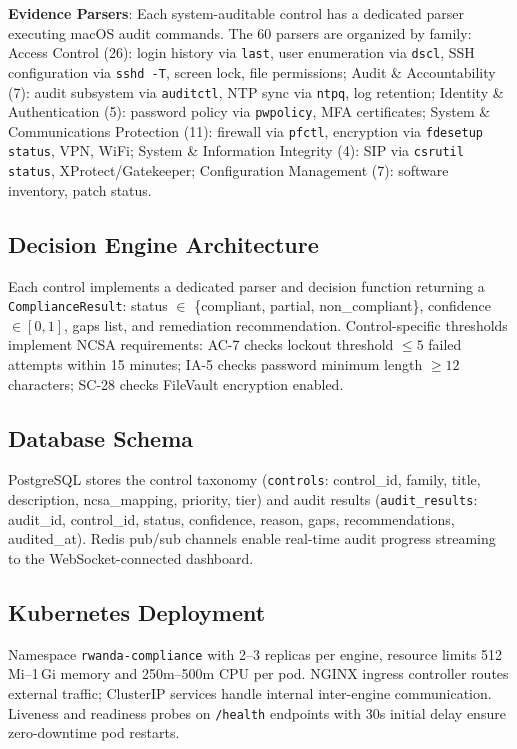 \documentclass[futureinternet,article,submit,pdftex,moreauthors]{Definitions/mdpi}
\begin{document}
\textbf{Evidence Parsers}: Each system-auditable control has a dedicated parser executing
macOS audit commands. The 60 parsers are organized by family: Access Control (26): login
history via \texttt{last}, user enumeration via \texttt{dscl}, SSH configuration via
\texttt{sshd -T}, screen lock, file permissions; Audit \& Accountability (7): audit subsystem
via \texttt{auditctl}, NTP sync via \texttt{ntpq}, log retention; Identity \& Authentication
(5): password policy via \texttt{pwpolicy}, MFA certificates; System \& Communications
Protection (11): firewall via \texttt{pfctl}, encryption via \texttt{fdesetup status}, VPN,
WiFi; System \& Information Integrity (4): SIP via \texttt{csrutil status}, XProtect/Gatekeeper;
Configuration Management (7): software inventory, patch status.

\subsection{Decision Engine Architecture}

Each control implements a dedicated parser and decision function returning a
\texttt{ComplianceResult}: status $\in$ \{compliant, partial, non\_compliant\},
confidence $\in [0,1]$, gaps list, and remediation recommendation. Control-specific thresholds
implement NCSA requirements: AC-7 checks lockout threshold $\leq 5$ failed attempts within
15 minutes; IA-5 checks password minimum length $\geq 12$ characters; SC-28 checks FileVault
encryption enabled.

\subsection{Database Schema}

PostgreSQL stores the control taxonomy (\texttt{controls}: control\_id, family, title,
description, ncsa\_mapping, priority, tier) and audit results (\texttt{audit\_results}:
audit\_id, control\_id, status, confidence, reason, gaps, recommendations, audited\_at).
Redis pub/sub channels enable real-time audit progress streaming to the WebSocket-connected
dashboard.

\subsection{Kubernetes Deployment}

Namespace \texttt{rwanda-compliance} with 2--3 replicas per engine, resource limits
512\,Mi--1\,Gi memory and 250m--500m CPU per pod. NGINX ingress controller routes external
traffic; ClusterIP services handle internal inter-engine communication. Liveness and readiness
probes on \texttt{/health} endpoints with 30s initial delay ensure zero-downtime pod restarts.
\end{document}
